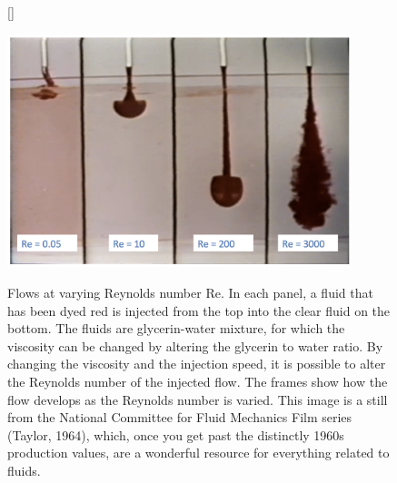 \documentclass[a4paper,10pt]{article}
\begin{document}
\begin{figure}[h]
    [\FBwidth]
    {\caption{\footnotesize{Flows at varying Reynolds number Re. In each panel, a fluid that has been dyed red is injected from the top into the clear fluid on the bottom. The fluids are glycerin-water mixture, for which the viscosity can be changed by altering the glycerin to water ratio. By changing the viscosity and the injection speed, it is possible to alter the Reynolds number of the injected flow. The frames show how the flow develops as the Reynolds number is varied. This image is a still from the National Committee for Fluid Mechanics Film series (Taylor, 1964), which, once you get past the distinctly 1960s production values, are a wonderful resource for everything related to fluids.}}
    \label{fig:variablezones}}
    {\includegraphics[width=10cm]{figures/ReynoldsNumber.png}}
\end{figure}
\end{document}
